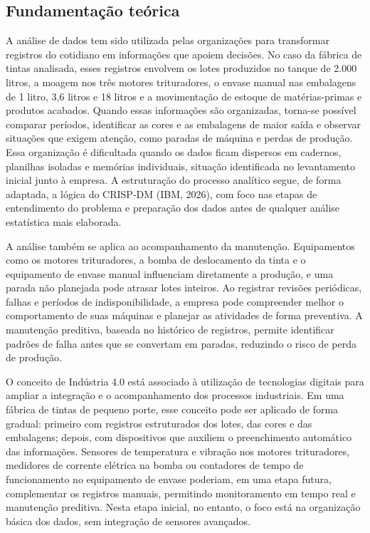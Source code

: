 \documentclass[12pt,a4paper]{article}
\begin{document}
\subsection{Fundamentação teórica}
A análise de dados tem sido utilizada pelas organizações para transformar registros do cotidiano em informações que apoiem decisões. No caso da fábrica de tintas analisada, esses registros envolvem os lotes produzidos no tanque de 2.000 litros, a moagem nos três motores trituradores, o envase manual nas embalagens de 1 litro, 3,6 litros e 18 litros e a movimentação de estoque de matérias-primas e produtos acabados. Quando essas informações são organizadas, torna-se possível comparar períodos, identificar as cores e as embalagens de maior saída e observar situações que exigem atenção, como paradas de máquina e perdas de produção. Essa organização é dificultada quando os dados ficam dispersos em cadernos, planilhas isoladas e memórias individuais, situação identificada no levantamento inicial junto à empresa. A estruturação do processo analítico segue, de forma adaptada, a lógica do CRISP-DM (IBM, 2026), com foco nas etapas de entendimento do problema e preparação dos dados antes de qualquer análise estatística mais elaborada.

A análise também se aplica ao acompanhamento da manutenção. Equipamentos como os motores trituradores, a bomba de deslocamento da tinta e o equipamento de envase manual influenciam diretamente a produção, e uma parada não planejada pode atrasar lotes inteiros. Ao registrar revisões periódicas, falhas e períodos de indisponibilidade, a empresa pode compreender melhor o comportamento de suas máquinas e planejar as atividades de forma preventiva. A manutenção preditiva, baseada no histórico de registros, permite identificar padrões de falha antes que se convertam em paradas, reduzindo o risco de perda de produção.

O conceito de Indústria 4.0 está associado à utilização de tecnologias digitais para ampliar a integração e o acompanhamento dos processos industriais. Em uma fábrica de tintas de pequeno porte, esse conceito pode ser aplicado de forma gradual: primeiro com registros estruturados dos lotes, das cores e das embalagens; depois, com dispositivos que auxiliem o preenchimento automático das informações. Sensores de temperatura e vibração nos motores trituradores, medidores de corrente elétrica na bomba ou contadores de tempo de funcionamento no equipamento de envase poderiam, em uma etapa futura, complementar os registros manuais, permitindo monitoramento em tempo real e manutenção preditiva. Nesta etapa inicial, no entanto, o foco está na organização básica dos dados, sem integração de sensores avançados.
\end{document}
